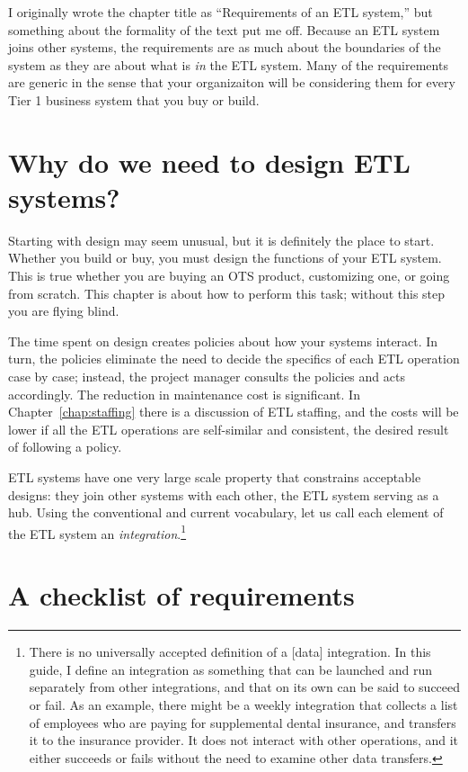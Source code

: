 \documentclass[11pt,letterpaper,twosided]{memoir}
\begin{document}
I originally wrote the chapter title as ``Requirements of an
ETL system,'' but something about the formality of the text
put me off. Because an ETL system joins other systems, the 
requirements are as much about the boundaries of the system as
they are about what is \emph{in} the ETL system.
Many of the requirements are generic
in the sense that your organizaiton will be considering them
for every Tier 1 business system that you buy or build.

\section{Why do we need to design ETL systems?}

Starting with design may seem unusual, but it is definitely the
place to start.  Whether you build or buy, you must design the
functions of your ETL system. This is true whether you are buying
an OTS product, customizing one, or going from scratch. This chapter
is about how to perform this task; without this step you are flying
blind.

The time spent on design creates policies about how your systems
interact.  In turn, the policies eliminate the need to decide the
specifics of each ETL operation case by case; instead, the project
manager consults the policies and acts accordingly. The reduction
in maintenance cost is significant. In Chapter~\ref{chap:staffing}
there is a discussion of ETL staffing, and the costs will be lower
if all the ETL operations are self-similar and consistent, the
desired result of following a policy.

ETL systems have one very large scale property that constrains
acceptable designs: they join other systems with each other, the
ETL system serving as a hub. Using the conventional and current
vocabulary, let us call each element of the ETL system an
\emph{integration}.\footnote{There is no universally accepted
definition of a [data] integration.  In this guide, I define an
integration as something that can be launched and run separately
from other integrations, and that on its own can be said to succeed
or fail. As an example, there might be a weekly integration that
collects a list of employees who are paying for supplemental dental
insurance, and transfers it to the insurance provider. It does not
interact with other operations, and it either succeeds or fails
without the need to examine other data transfers.}

\section{A checklist of requirements}
\end{document}
